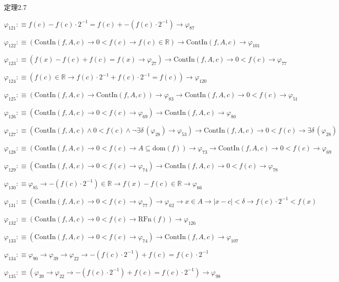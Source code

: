 \begin{fullproof}{定理2.7}
\begin{abbrevlist}
\item $\varphi_{121} :\equiv f(c) - f(c) \cdot 2^{-1} = f(c) + -(f(c) \cdot 2^{-1}) \to \varphi_{87}$
\item $\varphi_{122} :\equiv (\mathrm{ContIn}(f,A,c) \to 0 < f(c) \to f(c) \in \mathbb{R}) \to \mathrm{ContIn}(f,A,c) \to \varphi_{101}$
\item $\varphi_{123} :\equiv (f(x) - f(c) + f(c) = f(x) \to \varphi_{27}) \to \mathrm{ContIn}(f,A,c) \to 0 < f(c) \to \varphi_{77}$
\item $\varphi_{124} :\equiv (f(c) \in \mathbb{R} \to f(c) \cdot 2^{-1} + f(c) \cdot 2^{-1} = f(c)) \to \varphi_{120}$
\item $\varphi_{125} :\equiv (\mathrm{ContIn}(f,A,c) \to \mathrm{ContIn}(f,A,c)) \to \varphi_{83} \to \mathrm{ContIn}(f,A,c) \to 0 < f(c) \to \varphi_{51}$
\item $\varphi_{126} :\equiv (\mathrm{ContIn}(f,A,c) \to 0 < f(c) \to \varphi_{69}) \to \mathrm{ContIn}(f,A,c) \to \varphi_{80}$
\item $\varphi_{127} :\equiv (\mathrm{ContIn}(f,A,c) \land 0 < f(c) \land \neg \exists \delta\,(\varphi_{28}) \to \varphi_{53}) \to \mathrm{ContIn}(f,A,c) \to 0 < f(c) \to \exists \delta\,(\varphi_{28})$
\item $\varphi_{128} :\equiv (\mathrm{ContIn}(f,A,c) \to 0 < f(c) \to A \subseteq \mathrm{dom}(f)) \to \varphi_{73} \to \mathrm{ContIn}(f,A,c) \to 0 < f(c) \to \varphi_{69}$
\item $\varphi_{129} :\equiv (\mathrm{ContIn}(f,A,c) \to 0 < f(c) \to \varphi_{74}) \to \mathrm{ContIn}(f,A,c) \to 0 < f(c) \to \varphi_{78}$
\item $\varphi_{130} :\equiv \varphi_{85} \to -(f(c) \cdot 2^{-1}) \in \mathbb{R} \to f(x) - f(c) \in \mathbb{R} \to \varphi_{66}$
\item $\varphi_{131} :\equiv (\mathrm{ContIn}(f,A,c) \to 0 < f(c) \to \varphi_{77}) \to \varphi_{62} \to x \in A \to \lvert x - c \rvert < \delta \to f(c) \cdot 2^{-1} < f(x)$
\item $\varphi_{132} :\equiv (\mathrm{ContIn}(f,A,c) \to 0 < f(c) \to \mathrm{RFn}(f)) \to \varphi_{126}$
\item $\varphi_{133} :\equiv (\mathrm{ContIn}(f,A,c) \to 0 < f(c) \to \varphi_{74}) \to \mathrm{ContIn}(f,A,c) \to \varphi_{107}$
\item $\varphi_{134} :\equiv \varphi_{90} \to \varphi_{39} \to \varphi_{22} \to -(f(c) \cdot 2^{-1}) + f(c) = f(c) \cdot 2^{-1}$
\item $\varphi_{135} :\equiv (\varphi_{39} \to \varphi_{22} \to -(f(c) \cdot 2^{-1}) + f(c) = f(c) \cdot 2^{-1}) \to \varphi_{98}$

\end{abbrevlist}
\end{fullproof}
